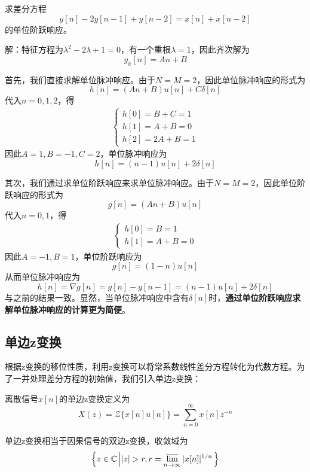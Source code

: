 \begin{example}
    求差分方程
    $$y[n]-2y[n-1]+y[n-2]=x[n]+x[n-2]$$
    的单位阶跃响应。

    解：特征方程为$\lambda^2-2\lambda+1=0$，有一个重根$\lambda=1$，因此齐次解为
    $$y_h[n]=A n+B$$

    首先，我们直接求解单位脉冲响应。由于$N=M=2$，因此单位脉冲响应的形式为
    $$h[n]=(A n+B)u[n]+C\delta[n]$$
    代入$n=0,1,2$，得\begin{align*}
    \begin{cases}
        h[0]=B+C=1\\
        h[1]=A+B=0\\
        h[2]=2A+B=1
    \end{cases}
    \end{align*}
    因此$A=1,B=-1,C=2$，单位脉冲响应为
    $$h[n]=(n-1)u[n]+2\delta[n]$$

    其次，我们通过求单位阶跃响应来求单位脉冲响应。由于$N=M=2$，因此单位阶跃响应的形式为
    $$g[n]=(A n+B)u[n]$$
    代入$n=0,1$，得\begin{align*}
        \begin{cases}
            h[0]=B=1\\
            h[1]=A+B=0
        \end{cases}
    \end{align*}
    因此$A=-1,B=1$，单位阶跃响应为
    $$g[n]=(1-n)u[n]$$
    从而单位脉冲响应为
    $$h[n]=\nabla g[n]=g[n]-g[n-1]=(n-1)u[n]+2\delta[n]$$
    与之前的结果一致。显然，当单位脉冲响应中含有$\delta[n]$时，\textbf{通过单位阶跃响应求解单位脉冲响应的计算更为简便}。
\end{example}

\subsection{单边z变换}\label{sub:single_z}

根据z变换的移位性质，利用z变换可以将常系数线性差分方程转化为代数方程。为了一并处理差分方程的初始值，我们引入单边z变换：
\begin{definition}[单边z变换]
    离散信号$x[n]$的单边z变换定义为
    \[X(z)=\mathcal{Z}\{x[n]u[n]\}=\sum_{n=0}^{\infty}x[n]z^{-n}\]
\end{definition}

单边z变换相当于因果信号的双边z变换，收敛域为
$$\left\{z\in\mathbb{C}\left||z|>r, r=\varlimsup_{n\to\infty}|x[n]|^{1/n}\right.\right\}$$

